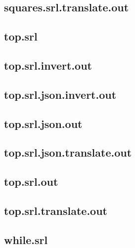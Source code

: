 \subsection{squares.srl.translate.out}
\label{app:squares_srl.translate.out}

\subsection{top.srl}
\label{app:top_srl}

\subsection{top.srl.invert.out}
\label{app:top_srl.invert.out}

\subsection{top.srl.json.invert.out}
\label{app:top_srl.json.invert.out}

\subsection{top.srl.json.out}
\label{app:top_srl.json.out}

\subsection{top.srl.json.translate.out}
\label{app:top_srl.json.translate.out}

\subsection{top.srl.out}
\label{app:top_srl.out}

\subsection{top.srl.translate.out}
\label{app:top_srl.translate.out}

\subsection{while.srl}
\label{app:while_srl}

